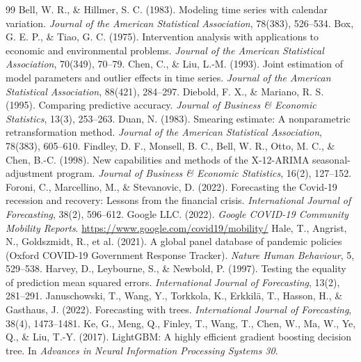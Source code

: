 \documentclass{article}
\theoremstyle{definition}
\begin{document}
\begin{thebibliography}{99}
\setlength{\itemsep}{2pt}\small
{} Bell, W. R., \& Hillmer, S. C. (1983). Modeling time series with calendar variation. \emph{Journal of the American Statistical Association}, 78(383), 526--534.
 Box, G. E. P., \& Tiao, G. C. (1975). Intervention analysis with applications to economic and environmental problems. \emph{Journal of the American Statistical Association}, 70(349), 70--79.
 Chen, C., \& Liu, L.-M. (1993). Joint estimation of model parameters and outlier effects in time series. \emph{Journal of the American Statistical Association}, 88(421), 284--297.
 Diebold, F. X., \& Mariano, R. S. (1995). Comparing predictive accuracy. \emph{Journal of Business \& Economic Statistics}, 13(3), 253--263.
 Duan, N. (1983). Smearing estimate: A nonparametric retransformation method. \emph{Journal of the American Statistical Association}, 78(383), 605--610.
 Findley, D. F., Monsell, B. C., Bell, W. R., Otto, M. C., \& Chen, B.-C. (1998). New capabilities and methods of the X-12-ARIMA seasonal-adjustment program. \emph{Journal of Business \& Economic Statistics}, 16(2), 127--152.
 Foroni, C., Marcellino, M., \& Stevanovic, D. (2022). Forecasting the Covid-19 recession and recovery: Lessons from the financial crisis. \emph{International Journal of Forecasting}, 38(2), 596--612.
 Google LLC. (2022). \emph{Google COVID-19 Community Mobility Reports}. \url{https://www.google.com/covid19/mobility/}
 Hale, T., Angrist, N., Goldszmidt, R., et al. (2021). A global panel database of pandemic policies (Oxford COVID-19 Government Response Tracker). \emph{Nature Human Behaviour}, 5, 529--538.
 Harvey, D., Leybourne, S., \& Newbold, P. (1997). Testing the equality of prediction mean squared errors. \emph{International Journal of Forecasting}, 13(2), 281--291.
 Januschowski, T., Wang, Y., Torkkola, K., Erkkilä, T., Hasson, H., \& Gasthaus, J. (2022). Forecasting with trees. \emph{International Journal of Forecasting}, 38(4), 1473--1481.
 Ke, G., Meng, Q., Finley, T., Wang, T., Chen, W., Ma, W., Ye, Q., \& Liu, T.-Y. (2017). LightGBM: A highly efficient gradient boosting decision tree. In \emph{Advances in Neural Information Processing Systems 30}.

\end{thebibliography}
\end{document}
